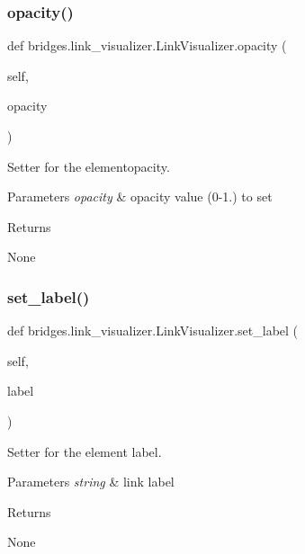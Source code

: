 \subsubsection{\texorpdfstring{opacity()}{opacity()}\hspace{0.1cm}{\footnotesize\ttfamily [2/2]}}
{\footnotesize\ttfamily def bridges.\+link\+\_\+visualizer.\+Link\+Visualizer.\+opacity (\begin{DoxyParamCaption}\item[{}]{self,  }\item[{}]{opacity }\end{DoxyParamCaption})}



Setter for the elementopacity. 


\begin{DoxyParams}{Parameters}
{\em opacity} & opacity value (0-\/1.) to set \\
\hline
\end{DoxyParams}
\begin{DoxyReturn}{Returns}


None 
\end{DoxyReturn}
\mbox{\label{classbridges_1_1link__visualizer_1_1_link_visualizer_a51cb90a9162271fa083616321ae5faee}} 
\subsubsection{\texorpdfstring{set\_label()}{set\_label()}}
{\footnotesize\ttfamily def bridges.\+link\+\_\+visualizer.\+Link\+Visualizer.\+set\+\_\+label (\begin{DoxyParamCaption}\item[{}]{self,  }\item[{}]{label }\end{DoxyParamCaption})}



Setter for the element label. 


\begin{DoxyParams}{Parameters}
{\em string} & link label \\
\hline
\end{DoxyParams}
\begin{DoxyReturn}{Returns}


None 
\end{DoxyReturn}
\mbox{\label{classbridges_1_1link__visualizer_1_1_link_visualizer_a17741aa4c8ca0ecb3333e4320ae8ccd8}} 
